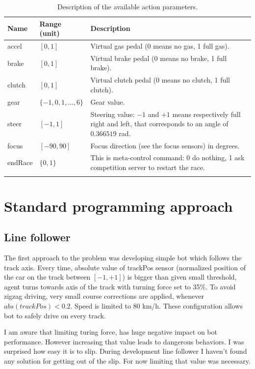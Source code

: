 \documentclass[declaration,shortabstract,english,inz]{iithesis}
\begin{document}
\begin{center}
    \begin{longtable}{ | p{} |p{}| p{} |}
    \hline
    \textbf{Name} & \textbf{Range (unit)} & \textbf{Description}  \\ 
    \hline
    accel & $[0,1]$ & Virtual gas pedal (0 means no gas, 1 full gas). \\ 
     \hline
     brake &  $[0,1]$ & Virtual brake pedal (0 means no brake, 1 full brake). \\ 
     \hline
     clutch &  $[0,1]$ & Virtual clutch pedal (0 means no clutch, 1 full clutch). \\ 
     \hline
     gear & $\{-1,0,1,\dots ,6\}$ & Gear value. \\ 
     \hline
     steer &  $[-1,1]$ & Steering value: $-1$ and $+1$ means respectively full right and
     left, that corresponds to an angle of $0.366519$ rad. \\ 
     \hline
     focus &  $[-90,90]$ & Focus direction (see the focus sensors) in degrees. \\ 
     \hline
     endRace &  $\{0,1\}$ & This is meta-control command: 0 do nothing, 1 ask competition
     server to restart the race. \\ 
     \hline
     \caption{\label{tab:torcs_actions}Description of the available  action parameters.}
    \end{longtable}
\end{center}

\chapter{Standard programming approach}

\section{Line follower}

The first approach to the problem was developing simple bot which follows the track axis. Every time, absolute value of trackPos sensor (normalized position of the car on the track between $[-1, +1]$) is bigger than given small threshold, agent turns towards axis of the track with turning force set to 35\%. To avoid zigzag driving, very small course corrections are applied, whenever $abs(trackPos) < 0.2$. Speed is limited to 80 km/h. These configuration allows bot to safely drive on every track. 

I am aware that limiting turing force, has huge negative impact on bot performance. However increasing that value leads to dangerous behaviors. I was surprised how easy it is to slip. During development line follower I haven't found any solution for getting out of the slip. For now limiting that value was necessary.
\end{document}
